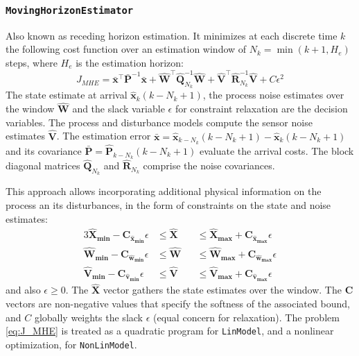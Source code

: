 \subsubsection{\textnormal{\texttt{MovingHorizonEstimator}}}

Also known as receding horizon estimation. It minimizes at each discrete time $k$ the following cost function over an estimation window of $N_k = \min(k+1, H_e)$ steps, where $H_e$ is the estimation horizon:
\begin{equation}\label{eq:J_MHE}
    J_{\mathit{MHE}} = \bar{\mathbf{x}}^\intercal \bar{\mathbf{P}}^{-1} \bar{\mathbf{x}} 
    + \mathbf{\hat{W}}^\intercal \mathbf{\hat{Q}}_{N_k}^{-1} \mathbf{\hat{W}}  
    + \mathbf{\hat{V}}^\intercal \mathbf{\hat{R}}_{N_k}^{-1} \mathbf{\hat{V}}
    + C \epsilon^2
\end{equation}
The state estimate at arrival $\mathbf{\hat{x}}_k(k-N_k+1)$, the process noise estimates over the window $\mathbf{\hat{W}}$ and the slack variable $\epsilon$ for constraint relaxation are the decision variables. The process and disturbance models compute the sensor noise estimates $\mathbf{\hat{V}}$. The estimation error $\bar{\mathbf{x}} = \mathbf{\hat{x}}_{k-N_k}(k-N_k+1) - \mathbf{\hat{x}}_{k}(k-N_k+1)$ and its covariance $\bar{\mathbf{P}} = \mathbf{\hat{P}}_{k-N_k}(k-N_k+1)$
evaluate the arrival costs. The block diagonal matrices $\mathbf{\hat{Q}}_{N_k}$ and $\mathbf{\hat{R}}_{N_k}$ comprise the noise covariances.

This approach allows incorporating additional physical information on the process an its disturbances, in the form of constraints on the state and noise estimates:
\begin{alignat}{3}
    \mathbf{\hat{X}_{min} - C_{\hat{x}_{min}}} \epsilon &\le \mathbf{\hat{X}} &&\le \mathbf{\hat{X}_{max} + C_{\hat{x}_{max}}} \epsilon \\
    \mathbf{\hat{W}_{min} - C_{\hat{w}_{min}}} \epsilon &\le \mathbf{\hat{W}} &&\le \mathbf{\hat{W}_{max} + C_{\hat{w}_{max}}} \epsilon \\
    \mathbf{\hat{V}_{min} - C_{\hat{v}_{min}}} \epsilon &\le \mathbf{\hat{V}} &&\le \mathbf{\hat{V}_{max} + C_{\hat{v}_{max}}} \epsilon
\end{alignat}
and also $\epsilon \ge 0$. The $\mathbf{\hat{X}}$ vector gathers the state estimates over the window. The $\mathbf{C}$ vectors are non-negative values that specify the softness of the associated bound, and $C$ globally weights the slack $\epsilon$ (equal concern for relaxation). The problem \eqref{eq:J_MHE} is treated as a quadratic program for \texttt{LinModel}, and a nonlinear optimization, for \texttt{NonLinModel}.

